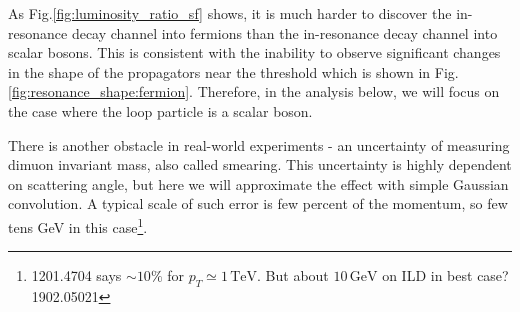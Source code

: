 \documentclass[11pt]{article}
\theoremstyle{definition}
\theoremstyle{remark}
\begin{document}
	As Fig.\ref{fig:luminosity_ratio_sf} shows, it is much harder to discover the in-resonance decay channel into fermions than the in-resonance decay channel into scalar bosons.
	This is consistent with the inability to observe significant changes in the shape of the propagators near the threshold which is shown in Fig.\ref{fig:resonance_shape:fermion}.
	Therefore, in the analysis below, we will focus on the case where the loop particle is a scalar boson.
	
	There is another obstacle in real-world experiments - an uncertainty of measuring dimuon invariant mass, also called smearing.
	This uncertainty is highly dependent on scattering angle, but here we will approximate the effect with simple Gaussian convolution.
	A typical scale of such error is few percent of the momentum, so few tens GeV in this case\footnote{1201.4704 says $\sim10\%$ for $p_{T}\simeq1\,\mathrm{TeV}$. But about $10\,\mathrm{GeV}$ on ILD in best case? 1902.05021}.
	
\end{document}
